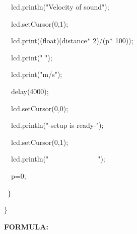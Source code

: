 \documentclass[12pt]{article}
\begin{document}
{\fontsize{14pt}{16.8pt}\selectfont \ \  lcd.println("Velocity of sound");\par}\par

{\fontsize{14pt}{16.8pt}\selectfont \ \  lcd.setCursor(0,1);\par}\par

{\fontsize{14pt}{16.8pt}\selectfont \ \  lcd.print((float)(distance$\ast$ 2)/(p$\ast$ 100));\par}\par

{\fontsize{14pt}{16.8pt}\selectfont \ \  lcd.print(" ");\par}\par

{\fontsize{14pt}{16.8pt}\selectfont \ \  lcd.print("m/s");\par}\par

{\fontsize{14pt}{16.8pt}\selectfont \ \  delay(4000);\par}\par

{\fontsize{14pt}{16.8pt}\selectfont \ \  lcd.setCursor(0,0);\par}\par

{\fontsize{14pt}{16.8pt}\selectfont \ \  lcd.println("-setup is ready-");\par}\par

{\fontsize{14pt}{16.8pt}\selectfont \ \  lcd.setCursor(0,1);\par}\par

{\fontsize{14pt}{16.8pt}\selectfont \ \  lcd.println("\ \ \ \ \ \ \ \ \ \ \ \ \ \  ");\par}\par

{\fontsize{14pt}{16.8pt}\selectfont \ \  p=0;\par}\par

{\fontsize{14pt}{16.8pt}\selectfont \  $ \} $ \par}\par

{\fontsize{14pt}{16.8pt}\selectfont $ \} $ \par}\par

\vspace{\baselineskip}
{\fontsize{14pt}{16.8pt}\selectfont \textbf{FORMULA:}\par}\par
\end{document}
